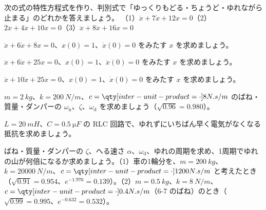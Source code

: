 \bkendproblems
{}

\bkproblem 次の式の特性方程式を作り、判別式で「ゆっくりもどる・ちょうど・ゆれながら止まる」のどれかを答えましょう。\newline
（1）\nobreak $\ddot x+7\dot x+12x=0$\quad（2）\nobreak $2\ddot x+4\dot x+10x=0$\quad（3）\nobreak $\ddot x+8\dot x+16x=0$

\bkproblem $\ddot x+6\dot x+8x=0$、$x(0)=1$、$\dot x(0)=0$ をみたす $x$ を求めましょう。

\bkproblem $\ddot x+6\dot x+25x=0$、$x(0)=1$、$\dot x(0)=0$ をみたす $x$ を求めましょう。

\bkproblem $\ddot x+10\dot x+25x=0$、$x(0)=1$、$\dot x(0)=0$ をみたす $x$ を求めましょう。

\bkproblem $m=\qty{2}{kg}$、$k=\qty{200}{N/m}$、$c=\bkvimNsm{8}$ のばね・質量・ダンパーの $\omega_{\mathrm n}$、$\zeta$、$\omega_{\mathrm d}$ を求めましょう（$\sqrt{0.96}=0.980$）。

\bkproblem $L=\qty{20}{mH}$、$C=\qty{0.5}{\micro F}$ の RLC 回路で、ゆれずにいちばん早く電気がなくなる抵抗を求めましょう。


\bkproblem ばね・質量・ダンパーの $\zeta$、へる速さ $\alpha$、$\omega_{\mathrm d}$、ゆれの周期を求め、1周期でゆれの山が何倍になるか求めましょう。\newline（1）車の1輪分を、$m=\qty{200}{kg}$、$k=\qty{20000}{N/m}$、$c=\bkvimNsm{1200}$ と考えたとき（$\sqrt{0.91}=0.954$、$e^{-1.976}=0.139$）。\newline（2）$m=\qty{0.5}{kg}$、$k=\qty{8}{N/m}$、$c=\bkvimNsm{0.4}$（6-7 のばね）のとき（$\sqrt{0.99}=0.995$、$e^{-0.632}=0.532$）。

